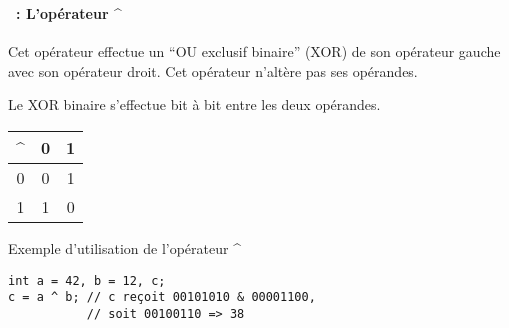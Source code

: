 \begin{frame}[containsverbatim]
  \frametitle{\secname}
  \framesubtitle{\subsecname~: L'opérateur \^{ }} 

  Cet opérateur effectue un ``OU exclusif binaire'' (XOR) de son opérateur gauche avec son opérateur droit. Cet opérateur n'altère pas ses opérandes.
  \vspace{0.3cm}
  \par
  Le XOR binaire s'effectue bit à bit entre les deux opérandes.
  \par
  \begin{center}
    \begin{tabular}{|c|c|c|}
      \hline
      \^{ } & 0 & 1 \\
      \hline
      0  & 0 & 1 \\
      \hline
      1  & 1 & 0 \\
      \hline
    \end{tabular}
  \end{center}
  \begin{exampleblock}{Exemple d'utilisation de l'opérateur \^{ }}
    \begin{verbatim}
int a = 42, b = 12, c;
c = a ^ b; // c reçoit 00101010 & 00001100, 
           // soit 00100110 => 38\end{verbatim}
  \end{exampleblock}
\end{frame}

